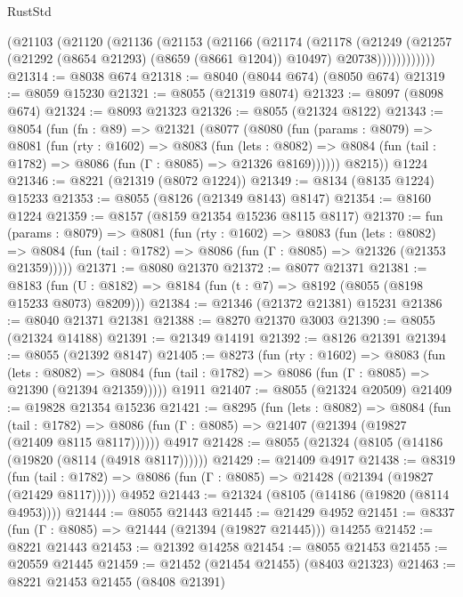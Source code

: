 \begin{lexlean}{RustStd}
\begin{coremodule}
          (@21103
            (@21120
              (@21136
                (@21153
                  (@21166
                    (@21174
                      (@21178
                        (@21249
                          (@21257
                            (@21292 (@8654 @21293) (@8659 (@8661 @1204)) @10497)
                            @20738))))))))))))
@21314 := @8038 @674
@21318 := @8040 (@8044 @674) (@8050 @674)
@21319 := @8059 @15230
@21321 := @8055 (@21319 @8074)
@21323 := @8097 (@8098 @674)
@21324 := @8093 @21323
@21326 := @8055 (@21324 @8122)
@21343 := @8054
    (fun (fn : @89) =>
    @21321
      (@8077
        (@8080
          (fun (params : @8079) =>
          @8081
            (fun (rty : @1602) =>
            @8083
              (fun (lets : @8082) =>
              @8084 (fun (tail : @1782) => @8086 (fun (Γ : @8085) => @21326 @8169))))))
        @8215))
    @1224
@21346 := @8221 (@21319 (@8072 @1224))
@21349 := @8134 (@8135 @1224) @15233
@21353 := @8055 (@8126 (@21349 @8143) @8147)
@21354 := @8160 @1224
@21359 := @8157 (@8159 @21354 @15236 @8115 @8117)
@21370 := fun (params : @8079) =>
  @8081
    (fun (rty : @1602) =>
    @8083
      (fun (lets : @8082) =>
      @8084 (fun (tail : @1782) => @8086 (fun (Γ : @8085) => @21326 (@21353 @21359)))))
@21371 := @8080 @21370
@21372 := @8077 @21371
@21381 := @8183
    (fun (U : @8182) => @8184 (fun (t : @7) => @8192 (@8055 (@8198 @15233 @8073) @8209)))
@21384 := @21346 (@21372 @21381) @15231
@21386 := @8040 @21371 @21381
@21388 := @8270 @21370 @3003
@21390 := @8055 (@21324 @14188)
@21391 := @21349 @14191
@21392 := @8126 @21391
@21394 := @8055 (@21392 @8147)
@21405 := @8273
    (fun (rty : @1602) =>
    @8083
      (fun (lets : @8082) =>
      @8084 (fun (tail : @1782) => @8086 (fun (Γ : @8085) => @21390 (@21394 @21359)))))
    @1911
@21407 := @8055 (@21324 @20509)
@21409 := @19828 @21354 @15236
@21421 := @8295
    (fun (lets : @8082) =>
    @8084
      (fun (tail : @1782) =>
      @8086 (fun (Γ : @8085) => @21407 (@21394 (@19827 (@21409 @8115 @8117))))))
    @4917
@21428 := @8055 (@21324 (@8105 (@14186 (@19820 (@8114 (@4918 @8117))))))
@21429 := @21409 @4917
@21438 := @8319
    (fun (tail : @1782) => @8086 (fun (Γ : @8085) => @21428 (@21394 (@19827 (@21429 @8117)))))
    @4952
@21443 := @21324 (@8105 (@14186 (@19820 (@8114 @4953))))
@21444 := @8055 @21443
@21445 := @21429 @4952
@21451 := @8337 (fun (Γ : @8085) => @21444 (@21394 (@19827 @21445))) @14255
@21452 := @8221 @21443
@21453 := @21392 @14258
@21454 := @8055 @21453
@21455 := @20559 @21445
@21459 := @21452 (@21454 @21455) (@8403 @21323)
@21463 := @8221 @21453 @21455 (@8408 @21391)

\end{coremodule}
\end{lexlean}
